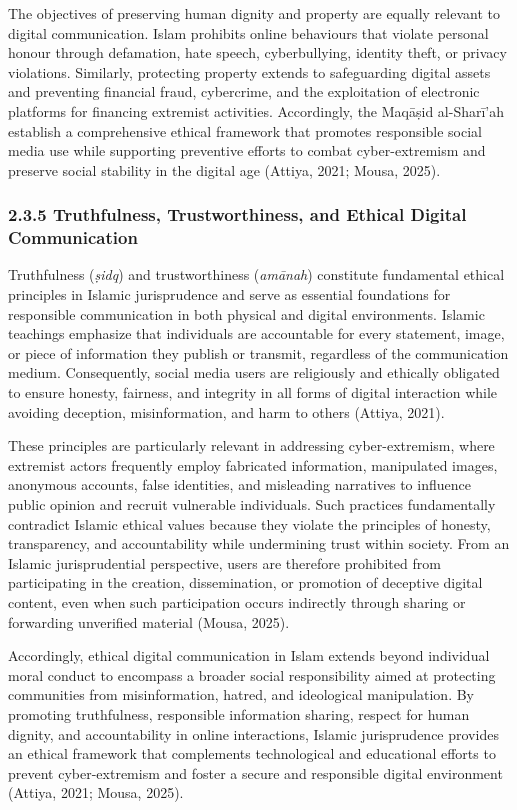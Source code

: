 \documentclass[10pt]{NSP1}
\begin{document}
	The objectives of preserving human dignity and property are equally relevant to digital communication. Islam prohibits online behaviours that violate personal honour through defamation, hate speech, cyberbullying, identity theft, or privacy violations. Similarly, protecting property extends to safeguarding digital assets and preventing financial fraud, cybercrime, and the exploitation of electronic platforms for financing extremist activities. Accordingly, the Maq\={a}\d{s}id al-Shar\={i}'ah establish a comprehensive ethical framework that promotes responsible social media use while supporting preventive efforts to combat cyber-extremism and preserve social stability in the digital age (Attiya, 2021; Mousa, 2025).
	
	\subsubsection*{2.3.5 Truthfulness, Trustworthiness, and Ethical Digital Communication}
	
	Truthfulness (\textit{\d{s}idq}) and trustworthiness (\textit{am\={a}nah}) constitute fundamental ethical principles in Islamic jurisprudence and serve as essential foundations for responsible communication in both physical and digital environments. Islamic teachings emphasize that individuals are accountable for every statement, image, or piece of information they publish or transmit, regardless of the communication medium. Consequently, social media users are religiously and ethically obligated to ensure honesty, fairness, and integrity in all forms of digital interaction while avoiding deception, misinformation, and harm to others (Attiya, 2021).
	
	These principles are particularly relevant in addressing cyber-extremism, where extremist actors frequently employ fabricated information, manipulated images, anonymous accounts, false identities, and misleading narratives to influence public opinion and recruit vulnerable individuals. Such practices fundamentally contradict Islamic ethical values because they violate the principles of honesty, transparency, and accountability while undermining trust within society. From an Islamic jurisprudential perspective, users are therefore prohibited from participating in the creation, dissemination, or promotion of deceptive digital content, even when such participation occurs indirectly through sharing or forwarding unverified material (Mousa, 2025).
	
	Accordingly, ethical digital communication in Islam extends beyond individual moral conduct to encompass a broader social responsibility aimed at protecting communities from misinformation, hatred, and ideological manipulation. By promoting truthfulness, responsible information sharing, respect for human dignity, and accountability in online interactions, Islamic jurisprudence provides an ethical framework that complements technological and educational efforts to prevent cyber-extremism and foster a secure and responsible digital environment (Attiya, 2021; Mousa, 2025).
	
\end{document}
